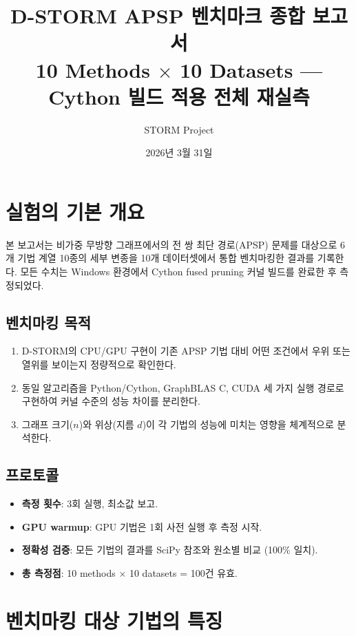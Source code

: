 \documentclass[11pt,a4paper]{article}
\title{\LARGE\textbf{D-STORM APSP 벤치마크 종합 보고서} \\[0.5em]
  \large 10 Methods $\times$ 10 Datasets --- Cython 빌드 적용 전체 재실측}
\author{STORM Project}
\date{2026년 3월 31일}
\begin{document}
\maketitle
\tableofcontents
\newpage

\section{실험의 기본 개요}

본 보고서는 비가중 무방향 그래프에서의 전 쌍 최단 경로(APSP) 문제를 대상으로 6개 기법 계열 10종의 세부 변종을 10개 데이터셋에서 통합 벤치마킹한 결과를 기록한다. 모든 수치는 Windows 환경에서 Cython fused pruning 커널 빌드를 완료한 후 측정되었다.

\subsection{벤치마킹 목적}
\begin{enumerate}[leftmargin=1.4em]
  \item D-STORM의 CPU/GPU 구현이 기존 APSP 기법 대비 어떤 조건에서 우위 또는 열위를 보이는지 정량적으로 확인한다.
  \item 동일 알고리즘을 Python/Cython, GraphBLAS C, CUDA 세 가지 실행 경로로 구현하여 커널 수준의 성능 차이를 분리한다.
  \item 그래프 크기($n$)와 위상(지름 $d$)이 각 기법의 성능에 미치는 영향을 체계적으로 분석한다.
\end{enumerate}

\subsection{프로토콜}
\begin{itemize}[leftmargin=1.4em]
  \item \textbf{측정 횟수}: 3회 실행, 최소값 보고.
  \item \textbf{GPU warmup}: GPU 기법은 1회 사전 실행 후 측정 시작.
  \item \textbf{정확성 검증}: 모든 기법의 결과를 SciPy 참조와 원소별 비교 (100\% 일치).
  \item \textbf{총 측정점}: 10 methods $\times$ 10 datasets = 100건 유효.
\end{itemize}

\section{벤치마킹 대상 기법의 특징}
\end{document}
